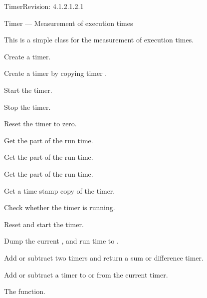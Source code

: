 \begin{manpage}{\libtitle}{Timer}{$ $Revision: 4.1.2.1.2.1 $ $}

\subtitle{Name}
    Timer --- Measurement of execution times


\subtitle{Description}
    This is a simple class for the measurement of execution times.


\subtitle{Declaration}

    Create a timer.

    Create a timer by copying timer .


\subtitle{Public \\ Operations}

    Start the timer.

    Stop the timer.

    Reset the timer to zero.

    Get the  part of the run time.

    Get the  part of the run time.

    Get the  part of the run time.

    Get a time stamp copy of the timer.

    Check whether the timer is running.

    Reset and start the timer.

    Dump the current ,  and  run time to
    .

    Add or subtract two timers and return a sum or difference timer.

    Add or subtract a timer to or from the current timer.


\subtitle{See Also}
    The  function.


\subtitle{Revision}

\end{manpage}
